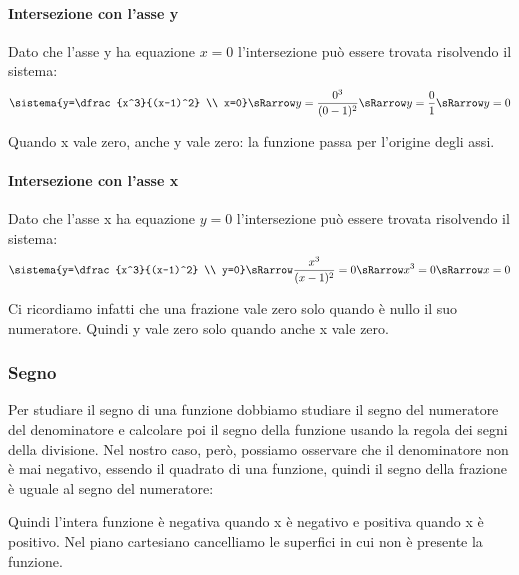 \begin{minipage}{.60\linewidth}
\paragraph{Intersezione con l'asse y}
Dato che l'asse y ha equazione \(x=0\) l'intersezione può essere trovata 
risolvendo il sistema:
\[\sistema{y=\dfrac{x^3}{(x-1)^2} \\ x=0} \sRarrow 
           y=\dfrac{0^3}{(0-1)^2} \sRarrow 
           y=\dfrac{0}{1} \sRarrow y=0\]

Quando x vale zero, anche y vale zero: la funzione passa per l'origine degli 
assi.
\paragraph{Intersezione con l'asse x}

Dato che l'asse x ha equazione \(y=0\) l'intersezione può essere trovata 
risolvendo il sistema:
\[\sistema{y=\dfrac{x^3}{(x-1)^2} \\ y=0} \sRarrow 
           \dfrac{x^3}{(x-1)^2}=0 \sRarrow x^3=0 \sRarrow x=0\]

Ci ricordiamo infatti che una frazione vale zero solo quando è nullo il suo 
numeratore.
Quindi y vale zero solo quando anche x vale zero.

\end{minipage}
\hfill
\begin{minipage}{.38\linewidth}
 \begin{center}
\assifunzionea
 \end{center}
\end{minipage}

\begin{minipage}{.60\linewidth}
\subsubsection{Segno}

Per studiare il segno di una funzione dobbiamo studiare il segno del 
numeratore del denominatore e calcolare poi il segno della funzione usando la 
regola dei segni della divisione. Nel nostro caso, però, possiamo osservare 
che il denominatore non è mai negativo, essendo il quadrato di una funzione, 
quindi il segno della frazione è uguale al segno del numeratore:
\begin{center}
 \segnoespressionea
\end{center}

Quindi l'intera funzione è negativa quando x è negativo e positiva quando x è 
positivo. Nel piano cartesiano cancelliamo le superfici in cui non è presente 
la funzione.

\end{minipage}
\hfill
\begin{minipage}{.38\linewidth}
 \begin{center}
\segnofunzionea
 \end{center}
\end{minipage}

